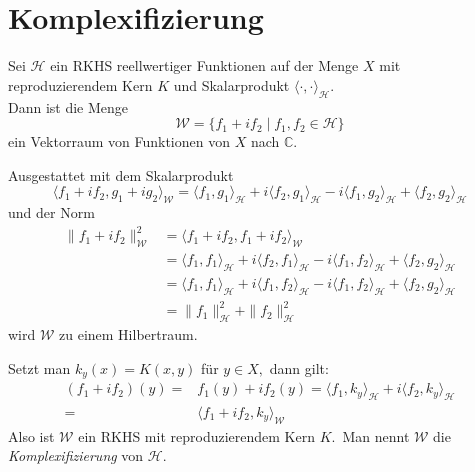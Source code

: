 \documentclass{beamer}
\begin{document}
\section{Komplexifizierung}
\begin{frame}
Sei $\mathcal{H}$ ein RKHS reellwertiger Funktionen auf der Menge $X$ mit reproduzierendem Kern $K$ und Skalarprodukt $\langle \cdot,\cdot \rangle_{\mathcal{H}}.$\pause  \\ Dann ist die Menge
\[
  \mathcal{W}=\{f_1+if_2\mid f_1,f_2\in \mathcal{H}\}
\]  
 ein Vektorraum von Funktionen von $X$ nach $\mathbb{C}.$ 
\end{frame}
\begin{frame}
Ausgestattet mit dem Skalarprodukt
 \[
\langle f_1+if_2,g_1+ig_2\rangle_{\mathcal{W}}=\langle f_1 ,g_1\rangle_{\mathcal{H}}+i\langle f_2,g_1\rangle_{\mathcal{H}}-i\langle f_1,g_2\rangle_{\mathcal{H}}+\langle f_2,g_2 \rangle_{\mathcal{H}}
 \]\pause
und der Norm 
\begin{align*}
\|f_1+if_2\|^2_{\mathcal{W}}&=\langle f_1+if_2,f_1+if_2 \rangle_{\mathcal{W}} \\
&=\langle f_1 ,f_1\rangle_{\mathcal{H}}+i\langle f_2,f_1\rangle_{\mathcal{H}}-i\langle f_1,f_2\rangle_{\mathcal{H}}+\langle f_2,g_2
 \rangle_{\mathcal{H}}\\
 &=\langle f_1 ,f_1\rangle_{\mathcal{H}}+i\langle f_1,f_2\rangle_{\mathcal{H}}-i\langle f_1,f_2\rangle_{\mathcal{H}}+\langle f_2,g_2\rangle_{\mathcal{H}}\\
 &=\|f_1\|_{\mathcal{H}}^2+\|f_2\|^2_\mathcal{H}
  \end{align*}
  wird $\mathcal{W}$ zu einem Hilbertraum. 
\end{frame}
\begin{frame}
Setzt man $k_y(x)=K(x,y)$ für $y\in X, $ dann gilt:\pause 
\begin{align*}
(f_1+if_2)(y)=&f_1(y)+if_2(y)=\langle f_1,k_y\rangle_{\mathcal{H}} +i\langle f_2,k_y\rangle_{\mathcal{H}}\\ =& \langle f_1+if_2,k_y\rangle_{\mathcal{W}}
\end{align*}\pause
Also ist $\mathcal{W}$ ein RKHS mit reproduzierendem Kern $K.$\pause \, Man nennt $\mathcal{W}$ die \emph{Komplexifizierung} von $\mathcal{H}.$
\end{frame}
\end{document}
